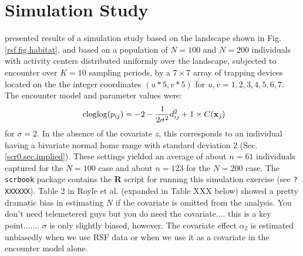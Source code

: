 \section{Simulation Study}

\citet{royle_etal:2012mee} presented results of a simulation study
based on the landscape shown in Fig. \ref{rsf.fig.habitat}, and based
on a population of $N=100$ and $N=200$ individuals with activity
centers distributed uniformly over the landscape, subjected to
encounter over $K=10$ sampling periods, by a $7 \times 7$ array of
trapping devices located on the the integer coordinates $(u*5,v*5)$
for $u,v = 1,2,3,4,5,6,7$. The encounter model and parameter values
were:
\[
\mbox{ cloglog}(p_{ij}) = -2  -\frac{1}{2\sigma^{2}} d_{ij}^{2} + 1 \times C({\bf x}_{j})
\]
for $\sigma =2$. In the absence of the covariate $z$, this corresponds
to an individual having a bivariate normal home range with standard
deviation 2 (Sec. \ref{scr0.sec.implied}).
These settings yielded an average of about $n=61$ individuals captured for
the $N=100$ case and about $n=123$ for the $N=200$ case. The \mbox{\tt
  scrbook} package contains the {\bf R} script for running this
simulation exercise (see \mbox{\tt ? XXXXXX}). Table 2 in Royle et
al. (expanded in Table XXX below) showed a pretty dramatic bias in estimating $N$ if the covariate
is omitted from the analysis. You don't need telemetered guys but you
do need the covariate.... this is a key point.......  $\sigma$ is only
slightly biased, however. The covariate effect $\alpha_{2}$ is
estimated unbiasedly when we use RSF data or when we use it as a
covariate in the encounter model alone. 

